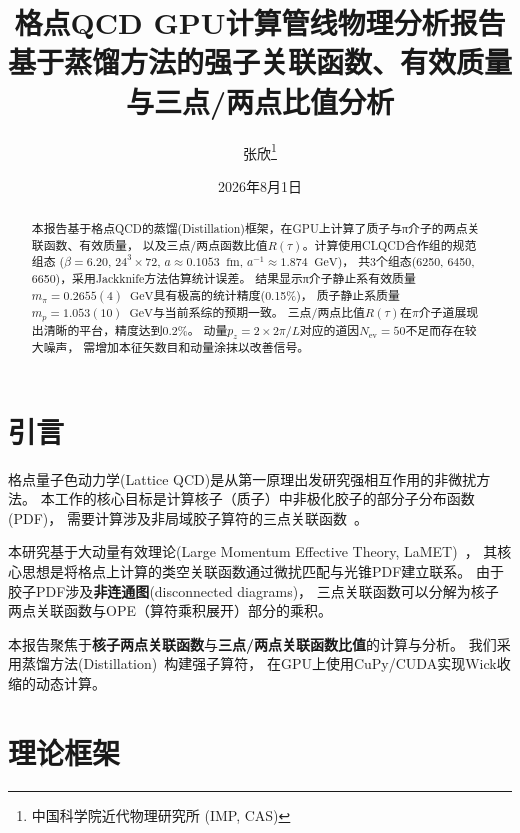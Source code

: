 \documentclass[11pt,a4paper]{article}
\title{\textbf{格点QCD GPU计算管线物理分析报告}\\[0.3em]
       \large 基于蒸馏方法的强子关联函数、有效质量与三点/两点比值分析}
\author{张欣\thanks{中国科学院近代物理研究所 (IMP, CAS)}}
\date{2026年8月1日}
\newcommand{\gev}{\;\mathrm{GeV}}
\newcommand{\fm}{\;\mathrm{fm}}
\newcommand{\Nev}{N_{\mathrm{ev}}}
\newcommand{\apm}{a^{-1}}
\begin{document}
\maketitle

\begin{abstract}
本报告基于格点QCD的蒸馏(Distillation)框架，在GPU上计算了质子与π介子的两点关联函数、有效质量，
以及三点/两点函数比值$R(\tau)$。计算使用CLQCD合作组的规范组态
($\beta=6.20$, $24^3\times 72$, $a\approx 0.1053\;\fm$, $\apm\approx 1.874\;\gev$)，
共3个组态(6250, 6450, 6650)，采用Jackknife方法估算统计误差。
结果显示π介子静止系有效质量$m_\pi = 0.2655(4)\;\gev$具有极高的统计精度(0.15\%)，
质子静止系质量$m_p = 1.053(10)\;\gev$与当前系综的预期一致。
三点/两点比值$R(\tau)$在$\pi$介子道展现出清晰的平台，精度达到0.2\%。
动量$p_z=2\times 2\pi/L$对应的道因$\Nev=50$不足而存在较大噪声，
需增加本征矢数目和动量涂抹以改善信号。
\end{abstract}

\tableofcontents
\newpage

\section{引言}

格点量子色动力学(Lattice QCD)是从第一原理出发研究强相互作用的非微扰方法。
本工作的核心目标是计算核子（质子）中非极化胶子的部分子分布函数(PDF)，
需要计算涉及非局域胶子算符的三点关联函数~\cite{zhang2019,fan2021}。

本研究基于大动量有效理论(Large Momentum Effective Theory, LaMET)~\cite{ji2013,ji2021}，
其核心思想是将格点上计算的类空关联函数通过微扰匹配与光锥PDF建立联系。
由于胶子PDF涉及\textbf{非连通图}(disconnected diagrams)，
三点关联函数可以分解为核子两点关联函数与OPE（算符乘积展开）部分的乘积。

本报告聚焦于\textbf{核子两点关联函数}与\textbf{三点/两点关联函数比值}的计算与分析。
我们采用蒸馏方法(Distillation)~\cite{peardon2009}构建强子算符，
在GPU上使用CuPy/CUDA实现Wick收缩的动态计算。

\section{理论框架}
\end{document}
